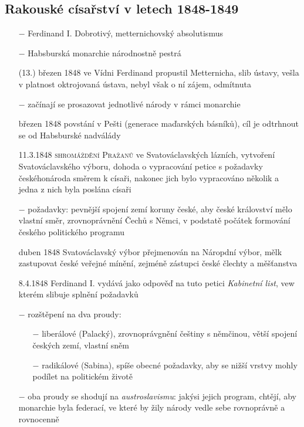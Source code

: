 \documentclass{article}
\begin{document}
\subsection*{Rakouské císařství v letech 1848-1849}
\begin{itemize}
    \vspace{-0.5em}
    \setlength\itemsep{0.15em}
    \item[$-$] Ferdinand I. Dobrotivý, metternichovský absolutismus
    \item[$-$] Habsburská monarchie národnostně pestrá
    \item[(13.) březen 1848] ve Vídni Ferdinand propustil Metternicha, slib ústavy, vešla v platnost oktrojovaná ústava, nebyl však o ní zájem, odmítnuta
    \item[$-$] začínají se prosazovat jednotlivé národy v rámci monarchie
    \item[březen 1848] povstání v Pešti (generace maďarských básníků), cíl je odtrhnout se od Habsburské nadválády
    \item[11.3.1848] \textsc{shromáždění Pražanů} ve Svatováclavských lázních, vytvoření Svatováclavského výboru, dohoda o vypracování petice s požadavky českéhonároda směrem k císaři, nakonec jich bylo vypracováno několik a jedna z nich byla poslána císaři
    \item[$-$] požadavky: pevnější spojení zemí koruny české, aby české království mělo vlastní směr, zrovnoprávnění Čechů s Němci, v podstatě počátek formování českého politického programu
    \item[duben 1848] Svatováclavský výbor přejmenován  na Náropdní výbor, mělk zastupovat české veřejné mínění, zejméně zástupci české člechty a měšťanstva
    \item[8.4.1848] Ferdinand I. vydává jako odpověď na tuto petici \textit{Kabinetní list}, vew kterém slibuje splnění požadavků
    \item[$-$] rozštěpení na dva proudy:
    \begin{itemize}
        \vspace{-0.5em}
        \setlength\itemsep{0.15em}
        \item[$-$] liberálové (Palacký), zrovnoprávgnění češtiny s němčinou, větší spojení českých zemí, vlastní sněm
        \item[$-$] radikálové (Sabina), spíše obecné požadavky, aby se nižší vrstvy mohly podílet na politickém životě
    \end{itemize}
    \item[$-$] oba proudy se shodují na \textit{austroslavismu}: jakýsi jejich program, chtějí, aby monarchie byla federací, ve které by žily národy vedle sebe rovnoprávně a rovnocenně

\end{itemize}
\end{document}
